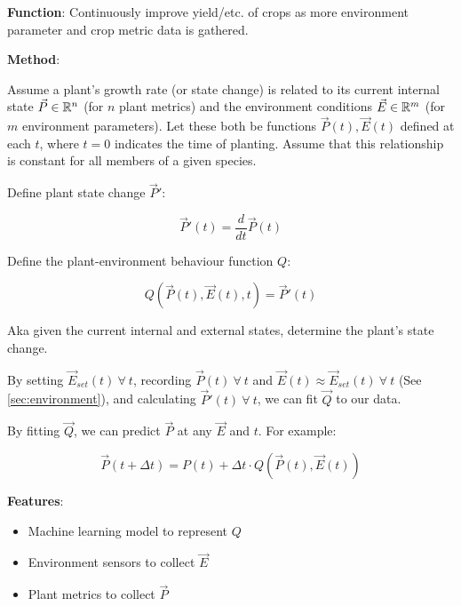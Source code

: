 \documentclass{report}
\begin{document}
\textbf{Function}: Continuously improve yield/etc. of crops as more environment parameter and crop metric data is gathered.

\textbf{Method}: 

Assume a plant's growth rate (or state change) is related to its current internal state $\vec P \in \mathbb R^n$ (for $n$ plant metrics) and the environment conditions $\vec E \in \mathbb R^m$ (for $m$ environment parameters). Let these both be functions $\vec P (t),\vec E(t)$ defined at each $t$, where $t=0$ indicates the time of planting. Assume that this relationship is constant for all members of a given species.

Define plant state change $\vec P'$: 

$$\vec P'(t) = \frac{d}{dt}\vec P(t)$$

Define the plant-environment behaviour function $Q$: 

$$Q(\vec P(t), \vec E(t), t)=\vec P'(t)$$ 

Aka given the current internal and external states, determine the plant's state change.

By setting $\vec E_{set}(t)~\forall~ t$, recording $\vec P(t)~\forall~ t$ and $\vec E(t)\approx \vec E_{set}(t)~\forall~ t$ (See \ref{sec:environment}), and calculating $\vec P'(t)~\forall~ t$, we can fit $\vec Q$ to our data.

By fitting $\vec Q$, we can predict $\vec P$ at any $\vec E$ and $t$. For example:

$$\vec P(t+\Delta t)=P(t)+\Delta t\cdot Q(\vec P(t),\vec E(t))$$

\textbf{Features}:
\begin{itemize}
    \item Machine learning model to represent $Q$
    \item Environment sensors to collect $\vec E$
    \item Plant metrics to collect $\vec P$
\end{itemize}

\newpage



\end{document}
